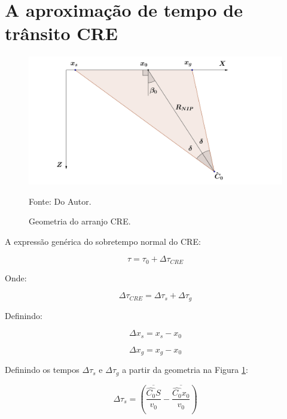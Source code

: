 \documentclass[a4paper, 12pt]{article}
\begin{document}
\section{A aproximação de tempo de trânsito CRE}

\begin{figure}[H]
\caption{Geometria do arranjo CRE.}
\begin{center}
\includegraphics[scale=0.5]{images/creGeom.png}
\vspace{-0.3cm}
\end{center}
\begin{center}
 Fonte: Do Autor.
\end{center}
\label{fig:1.1}
\end{figure}

A expressão genérica do sobretempo normal do CRE:

\begin{equation}
\label{eq:1.1}
\tau = \tau_0 + \Delta \tau_{CRE}
\end{equation}

Onde:

\begin{equation}
\label{eq:1.2}
\Delta \tau_{CRE} = \Delta \tau_s + \Delta \tau_g
\end{equation}

Definindo:

\begin{equation}
\label{eq:1.3}
\Delta x_s = x_s - x_0
\end{equation}

\begin{equation}
\label{eq:1.4}
\Delta x_g = x_g - x_0
\end{equation}

Definindo os tempos $\Delta \tau_s$ e $\Delta \tau_g$ a partir da geometria na Figura \ref{fig:1.1}:

\begin{equation}
\label{eq:1.5}
\Delta \tau_s = \left( \frac{\overline{\hat{C_0}S}}{v_0} - \frac{\overline{\hat{C_0}x_0}}{v_0} \right)
\end{equation}
\end{document}
